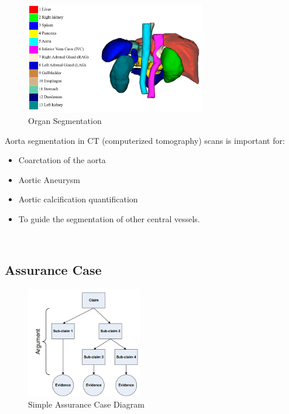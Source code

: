 \begin{figure}[ht]
    \centering
    \includegraphics[width=0.7\textwidth]{figures/Intro/segmentation.png}
    \caption[Organ Segmentation]{Organ Segmentation \cite{Ma-2021-AbdomenCT-1K}}
    \label{fig_seg}
\end{figure}

Aorta segmentation in CT (computerized tomography) scans is important for:
\begin{itemize}
\item Coarctation of the aorta
\item Aortic Aneurysm
\item Aortic calcification quantification
\item To guide the segmentation of other central vessels. 
\end{itemize} ~

\subsection{Assurance Case}\label{ac}
\begin{figure}[ht]
    \centering
    \includegraphics[width=0.45\textwidth]{figures/Intro/ac_diagram.png}
    \caption[Simple Assurance Case Diagram]{Simple Assurance Case Diagram \cite{doi:10.2514/6.2009-1921}}
    \label{fig_ac_diagram}
\end{figure}

